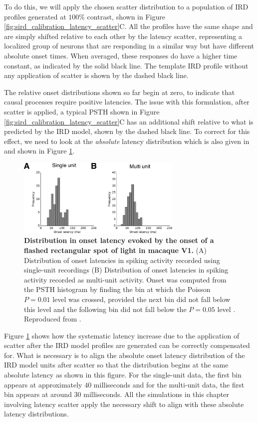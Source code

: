 \documentclass[phd,ianc,twoside]{infthesis}
\begin{document}
To do this, we will apply the chosen scatter distribution to a
population of IRD profiles generated at $100\%$ contrast, shown in
Figure \ref{fig:sird_calibration_latency_scatter}C. All the profiles
have the same shape and are simply shifted relative to each other by the
latency scatter, representing a localized group of neurons that are
responding in a similar way but have different absolute onset
times. When averaged, these responses do have a higher time constant, as
indicated by the solid black line. The template IRD profile without any
application of scatter is shown by the dashed black line.

The relative onset distributions shown so far begin at zero, to indicate
that causal processes require positive latencies. The issue with this
formulation, after scatter is applied, a typical PSTH shown in Figure
\ref{fig:sird_calibration_latency_scatter}C has an additional shift
relative to what is predicted by the IRD model, shown by the dashed
black line. To correct for this effect, we need to look at the
\emph{absolute} latency distribution which is also given in
\citet{nowak_visneuro95} and shown in Figure \ref{fig:nowak_data}.

\begin{figure}
\center
\includegraphics[width=0.7\textwidth]{./figures/nowak_data.pdf}
\caption{{\bf Distribution in onset latency evoked by the onset of a
    flashed rectangular spot of light in macaque V1.} (A) Distribution
  of onset latencies in spiking activity recorded using single-unit
  recordings (B) Distribution of onset latencies in spiking activity
  recorded as multi-unit activity. Onset was computed from the PSTH
  histogram by finding the bin at which the Poisson $P=0.01$ level was
  crossed, provided the next bin did not fall below this level and the
  following bin did not fall below the $P=0.05$ level
  \citep{maunsell_jneurophys92}. Reproduced from
  \citet{nowak_visneuro95}.}
\label{fig:nowak_data}
\end{figure}

Figure \ref{fig:nowak_data} shows how the systematic latency increase
due to the application of scatter after the IRD model profiles are
generated can be correctly compensated for. What is necessary is to
align the absolute onset latency distribution of the IRD model units
after scatter so that the distribution begins at the same absolute
latency as shown in this figure. For the single-unit data, the first bin
appears at approximately $40$ milliseconds and for the multi-unit data,
the first bin appears at around $30$ milliseconds. All the simulations
in this chapter involving latency scatter apply the necessary shift to
align with these absolute latency distributions.
\end{document}

